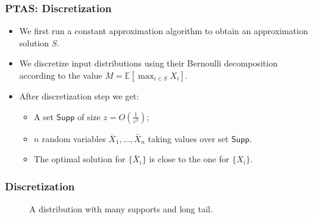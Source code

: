 \documentclass{beamer}
\newcommand{\Exp}{{\mathbb{E}}}
\begin{document}
\begin{frame}
    \frametitle{PTAS: Discretization}
    \begin{itemize}
        \item    We first run a constant approximation algorithm to obtain an approximation solution $S$.\\
        \item    We discretize input distributions using their Bernoulli decomposition according to the value $M = \Exp[\max_{i\in S} X_i]$.\\
        \item    After discretization step we get:
    \begin{itemize}
        \item A set $\mathsf{Supp}$ of size $z = O(\frac{1}{\varepsilon^2})$;
        \item $n$ random variables $\bar X_1, \ldots, \bar X_n$ taking values over set $\mathsf{Supp}$.
        \item The optimal solution for $\{\bar X_i\}$ is close to the one for $\{X_i\}$.
    \end{itemize}
    \end{itemize}

\end{frame}
\begin{frame}
    \frametitle{Discretization}
    \begin{figure}
    \caption{A distribution with many supports and long tail.}
\end{figure}
\end{frame}
\end{document}
